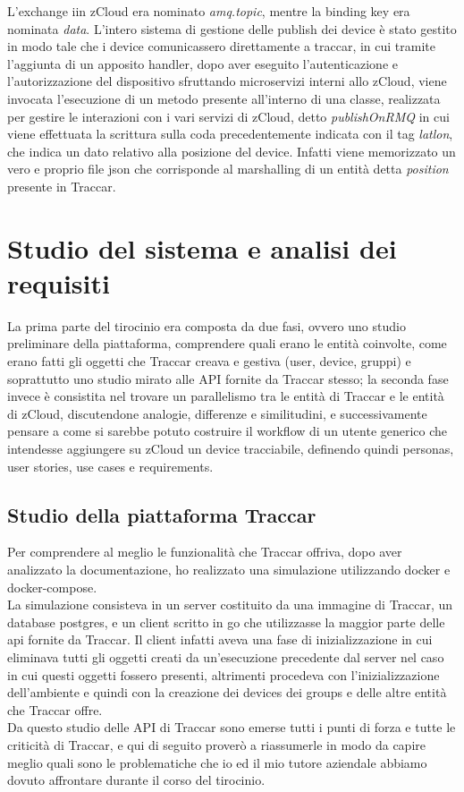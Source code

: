\documentclass[a4paper,titlepage,12pt]{book}
\begin{document}
L'exchange iin zCloud era nominato \textit{amq.topic}, mentre la binding key era nominata \textit{data}. L'intero sistema di gestione delle publish dei device è stato gestito in modo tale che i device comunicassero direttamente a traccar, in cui tramite l'aggiunta di un apposito handler, dopo aver eseguito l'autenticazione e l'autorizzazione del dispositivo sfruttando microservizi interni allo zCloud, viene invocata l'esecuzione di un metodo presente all'interno di una classe, realizzata per gestire le interazioni con i vari servizi di zCloud, detto \textit{publishOnRMQ} in cui viene effettuata la scrittura sulla coda precedentemente indicata con il tag \textit{latlon}, che indica un dato relativo alla posizione del device. Infatti viene memorizzato un vero e proprio file json che corrisponde al marshalling di un entità detta \textit{position} presente in Traccar.
\chapter{
\sffamily Studio del sistema e analisi dei requisiti}

La prima parte del tirocinio era composta da due fasi, ovvero uno studio preliminare della piattaforma, comprendere quali erano le entità coinvolte, come erano fatti gli oggetti che Traccar creava e gestiva (user, device, gruppi) e soprattutto uno studio mirato alle API fornite da Traccar stesso; la seconda fase invece è consistita nel trovare un parallelismo tra le entità di Traccar e le entità di zCloud, discutendone analogie, differenze e similitudini, e successivamente pensare a come si sarebbe potuto costruire il workflow di un utente generico che intendesse aggiungere su zCloud un device tracciabile, definendo quindi personas, user stories, use cases e requirements.\\

\section{
\sffamily Studio della piattaforma Traccar}
Per comprendere al meglio le funzionalità che Traccar offriva, dopo aver analizzato la documentazione, ho realizzato una simulazione utilizzando docker e docker-compose.\\
La simulazione consisteva in un server costituito da una immagine di Traccar, un database postgres, e un client scritto in go che utilizzasse la maggior parte delle api fornite da Traccar. Il client infatti aveva una fase di inizializzazione in cui eliminava tutti gli oggetti creati da un'esecuzione precedente dal server nel caso in cui questi oggetti fossero presenti, altrimenti procedeva con l'inizializzazione dell'ambiente e quindi con la creazione dei devices dei groups e delle altre entità che Traccar offre.\\
Da questo studio delle API di Traccar sono emerse tutti i punti di forza e tutte le criticità di Traccar, e qui di seguito proverò a riassumerle in modo da capire meglio quali sono le problematiche che io ed il mio tutore aziendale abbiamo dovuto affrontare durante il corso del tirocinio.\\
\end{document}
